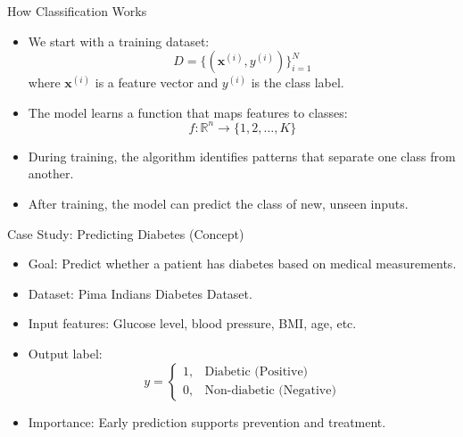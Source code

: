 \documentclass[serif, aspectratio=169]{beamer}
\begin{document}
    \begin{frame}{How Classification Works}
        \begin{itemize}\itemsep1em
        \item We start with a training dataset:
        \[
            D = \{(\mathbf{x}^{(i)}, y^{(i)})\}_{i=1}^{N}
        \]
        where $\mathbf{x}^{(i)}$ is a feature vector and $y^{(i)}$ is the class label.
        \item The model learns a function that maps features to classes:
        \[
            f: \mathbb{R}^n \rightarrow \{1, 2, \dots, K\}
        \]
        \item During training, the algorithm identifies patterns that separate one class from another.
        \item After training, the model can predict the class of new, unseen inputs.
        \end{itemize}
    \end{frame}

    \begin{frame}{Case Study: Predicting Diabetes (Concept)}
        \begin{itemize}\itemsep1em
        \item Goal: Predict whether a patient has diabetes based on medical measurements.
        \item Dataset: Pima Indians Diabetes Dataset.
        \item Input features: Glucose level, blood pressure, BMI, age, etc.
        \item Output label:
        \[
            y =
            \begin{cases}
                1, & \text{Diabetic (Positive)}\\
                0, & \text{Non-diabetic (Negative)}
            \end{cases}
        \]
        \item Importance: Early prediction supports prevention and treatment.
        \end{itemize}
    \end{frame}
\end{document}
